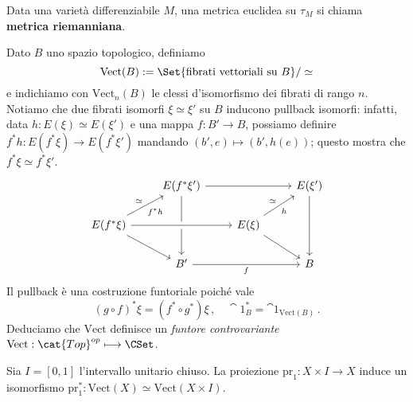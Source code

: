 \begin{df}
	Data una varietà differenziabile $M$,
	una metrica euclidea su $\tau_{M}$ si chiama \textbf{metrica riemanniana}.
\end{df}

Dato $B$ uno spazio topologico, definiamo
\begin{equation*}
	\mathrm{Vect}(B) := \Set{\text{fibrati vettoriali su } B}/\simeq
\end{equation*}
e indichiamo con $\mathrm{Vect}_{n}(B)$ le clessi d'isomorfismo
dei fibrati di rango $n$.
Notiamo che due fibrati isomorfi $\xi \simeq \xi'$ su $B$
inducono pullback isomorfi: infatti, data $h : E(\xi) \simeq E(\xi')$
e una mappa $f:B' \to B$, 
possiamo definire $f^{*}h : E(f^{*}\xi) \to E(f^{*}\xi')$ mandando $(b',e) \mapsto (b',h(e))$;
questo mostra che $f^{*}\xi \simeq f^{*}\xi'$.
\begin{equation*}
\begin{tikzcd}
                                                        & E(f^{*}\xi')  \arrow[dd] \ar[rr] &                                    & E(\xi') \arrow[dd] \\
E(f^{*}\xi) \arrow[rr] \arrow[rd] \arrow[ru, "f^{*}h"', "\simeq"] &                                    & E(\xi) \arrow[from=ll, crossing over] \arrow[rd] \arrow[ru, "h"', "\simeq"] &                    \\
                                                        & B' \arrow[rr, "f"']                &                                    & B                 
\end{tikzcd}
\end{equation*}
Il pullback è una costruzione funtoriale poiché vale
\begin{equation*}
	(g \circ f)^{*}\xi = (f^{*} \circ g^{*})\xi\,, \quad \cat{1}_{B}^{*} = \cat{1}_{\mathrm{Vect}(B)}\,.
\end{equation*}
Deduciamo che $\mathrm{Vect}$ definisce un \emph{funtore controvariante} 
	$\mathrm{Vect} : \cat{Top}^{op} \longmapsto \CSet$.




\begin{thm}\label{vect-htp}
	Sia $I = [0,1]$ l'intervallo unitario chiuso.
	La proiezione $\mathrm{pr}_{1}:X \times I \to X$ induce un isomorfismo
	$\mathrm{pr}_{1}^{*} : \mathrm{Vect}(X) \simeq \mathrm{Vect}(X \times I)$.
\end{thm}

